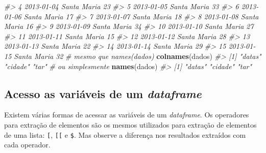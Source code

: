 \documentclass[]{book}
\newenvironment{Shaded}{\begin{snugshade}}{\end{snugshade}}
\newcommand{\KeywordTok}[1]{\textcolor[rgb]{0.13,0.29,0.53}{\textbf{#1}}}
\newcommand{\CommentTok}[1]{\textcolor[rgb]{0.56,0.35,0.01}{\textit{#1}}}
\newcommand{\NormalTok}[1]{#1}
\begin{document}
\begin{Shaded}
\begin{Highlighting}[]
\CommentTok{#> 4  2013-01-04 Santa Maria  23}
\CommentTok{#> 5  2013-01-05 Santa Maria  33}
\CommentTok{#> 6  2013-01-06 Santa Maria  17}
\CommentTok{#> 7  2013-01-07 Santa Maria  18}
\CommentTok{#> 8  2013-01-08 Santa Maria  16}
\CommentTok{#> 9  2013-01-09 Santa Maria  34}
\CommentTok{#> 10 2013-01-10 Santa Maria  27}
\CommentTok{#> 11 2013-01-11 Santa Maria  15}
\CommentTok{#> 12 2013-01-12 Santa Maria  28}
\CommentTok{#> 13 2013-01-13 Santa Maria  22}
\CommentTok{#> 14 2013-01-14 Santa Maria  29}
\CommentTok{#> 15 2013-01-15 Santa Maria  32}
\CommentTok{# mesmo que names(dados)}
\KeywordTok{colnames}\NormalTok{(dados)}
\CommentTok{#> [1] "datas"  "cidade" "tar"}
\CommentTok{# ou simplesmente}
\KeywordTok{names}\NormalTok{(dados)}
\CommentTok{#> [1] "datas"  "cidade" "tar"}
\end{Highlighting}
\end{Shaded}

\subsection{\texorpdfstring{Acesso as variáveis de um
\emph{dataframe}}{Acesso as variáveis de um dataframe}}\label{acesso-as-variaveis-de-um-dataframe}

Existem várias formas de acessar as variáveis de um \emph{dataframe}. Os
operadores para extração de elementos são os mesmos utilizados para
extração de elementos de uma lista: \texttt{{[}}, \texttt{{[}{[}} e
\texttt{\$}. Mas observe a diferença nos resultados extraídos com cada
operador.
\end{document}
